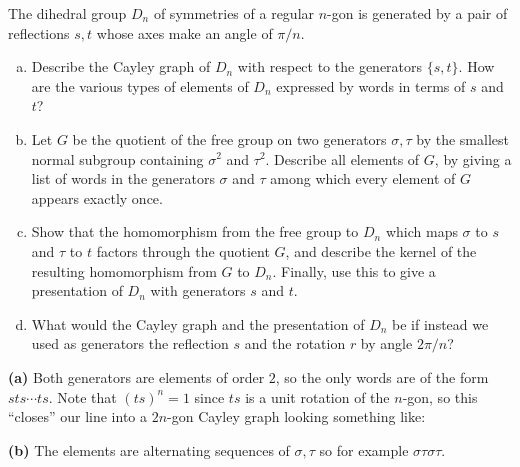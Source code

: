 \documentclass[11pt,letterpaper]{article}
\begin{document}
\pagebreak
\begin{problem}
The dihedral group $D_n$ of symmetries of a regular $n$-gon is generated
by a pair of reflections $s,t$ whose axes make an angle of $\pi/n$.

\begin{enumerate}[(a)]
    \item Describe the Cayley graph of $D_n$ with respect to the generators $\{s,t\}$. How are the various types of elements of $D_n$ expressed by words in terms of $s$ and $t$?
    \item Let $G$ be the quotient of the free group on two generators $\sigma,\tau$ by the smallest normal subgroup containing $\sigma^2$ and $\tau^2$. Describe all elements of $G$, by giving a list of words in the generators $\sigma$ and $\tau$ among which every element of $G$ appears exactly once.
    \item Show that the homomorphism from the free group to $D_n$ which maps $\sigma$ to $s$ and $\tau$ to $t$ factors through the quotient $G$, and describe the kernel of the resulting homomorphism from $G$ to $D_n$. Finally, use this to give a presentation of $D_n$ with generators $s$ and $t$.
    \item What would the Cayley graph and the presentation of $D_n$ be if instead we used as generators the reflection $s$ and the rotation $r$ by angle $2\pi/n$?
\end{enumerate}
\end{problem}

\textbf{(a)} Both generators are elements of order $2$, so the only words are of the form $sts\cdots ts$. Note that $(ts)^n=1$ since $ts$ is a unit rotation of the $n$-gon, so this ``closes'' our line into a $2n$-gon Cayley graph looking something like:

\begin{center}
\end{center}
\textbf{(b)} The elements are alternating sequences of $\sigma, \tau$ so for example $\sigma\tau \sigma\tau$.
\end{document}
